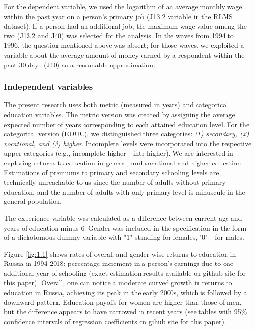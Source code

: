 \documentclass[12pt,a4paper]{article}
\numberwithin{equation}{section}
\begin{document}
For the dependent variable, we used the logarithm of an average monthly wage within the past year on a person's primary job (J13.2 variable in the RLMS dataset). If a person had an additional job, the maximum wage value among the two (J13.2 and J40) was selected for the analysis. In the waves from 1994 to 1996, the question mentioned above was absent; for those waves, we exploited a variable about the average amount of money earned by a respondent within the past 30 days (J10) as a reasonable approximation.

\subsubsection{Independent variables}

The present research uses both metric (measured in years) and categorical education variables. The metric version was created by assigning the average expected number of years corresponding to each attained education level. For the categorical version (EDUC), we distinguished three categories: \textit{(1) secondary, (2) vocational, and (3) higher}. Incomplete levels were incorporated into the respective upper categories (e.g., incomplete higher - into higher). We are interested in exploring returns to education in general, and vocational and higher education. Estimations of premiums to primary and secondary schooling levels are technically unreachable to us since the number of adults without primary education, and the number of adults with only primary level is minuscule in the general population. 

The experience variable was calculated as a difference between current age and years of education minus $6$. Gender was included in the specification in the form of a dichotomous dummy variable with "$1$" standing for females, "$0$" - for males.


Figure \ref{fig:1.1} shows rates of overall and gender-wise returns to education in Russia in 1994-2018: percentage increment in a person's earnings due to one additional year of schooling (exact estimation results available on github site for this paper). Overall, one can notice a moderate curved growth in returns to education in Russia, achieving its peak in the early 2000s, which is followed by a downward pattern. Education payoffs for women are higher than those of men, but the difference appears to have narrowed in recent years (see tables with 95\% confidence intervals of regression coefficients on gihub site for this paper).
\end{document}

